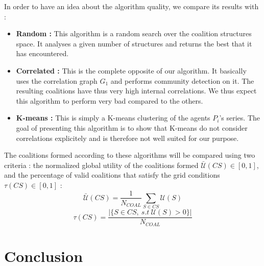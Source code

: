 \documentclass[conference]{IEEEtran}
\begin{document}
In order to have an idea about the algorithm quality, we compare its results with :
\begin{itemize}
\item \textbf{Random :} This algorithm is a random search over the coalition structures space. It analyses a given number of structures and returns the best that it has encountered.
\item \textbf{Correlated :} This is the complete opposite of our algorithm. It basically uses the correlation graph $ G_{1} $ and performs community detection on it. The resulting coalitions have thus very high internal correlations. We thus expect this algorithm to perform very bad compared to the others.
\item \textbf{K-means :} This is simply a K-means clustering of the agents $ P_{i} $'s series. The goal of presenting this algorithm is to show that K-means do not consider correlations explicitely and is therefore not well suited for our purpose.
\end{itemize} 

The coalitions formed according to these algorithms will be compared using two criteria : the normalized global utility of the coalitions formed $ \bar{\mathcal{U}}(CS) \in [0,1] $, and the percentage of valid coalitions that satisfy the grid conditions $ \tau(CS) \in [0,1] $ :
\begin{equation}
	\bar{\mathcal{U}}(CS) = \dfrac{1}{N_{COAL}} \sum_{S \in CS} \mathcal{U}(S)
\end{equation}
\begin{equation}
	\tau(CS) = \dfrac{|\{ S \in CS,\ s.t\ \mathcal{U}(S) > 0 \}|}{N_{COAL}}
\end{equation}


%
%
\section{Conclusion}
\label{sec:conclusion}


%
%
 
  

\end{document}
